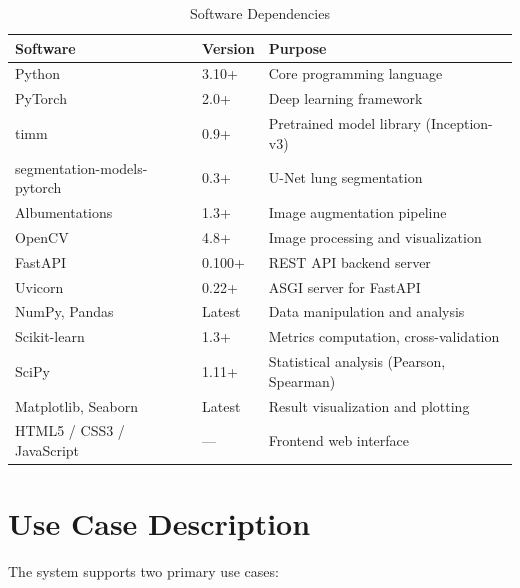 \documentclass[12pt]{report}
\begin{document}
\begin{table}[H]
\centering
\caption{Software Dependencies}
\renewcommand{\arraystretch}{1.2}
\begin{tabular}{|l|l|p{5cm}|}
\hline
\textbf{Software} & \textbf{Version} & \textbf{Purpose} \\
\hline
Python & 3.10+ & Core programming language \\
PyTorch & 2.0+ & Deep learning framework \\
timm & 0.9+ & Pretrained model library (Inception-v3) \\
segmentation-models-pytorch & 0.3+ & U-Net lung segmentation \\
Albumentations & 1.3+ & Image augmentation pipeline \\
OpenCV & 4.8+ & Image processing and visualization \\
FastAPI & 0.100+ & REST API backend server \\
Uvicorn & 0.22+ & ASGI server for FastAPI \\
NumPy, Pandas & Latest & Data manipulation and analysis \\
Scikit-learn & 1.3+ & Metrics computation, cross-validation \\
SciPy & 1.11+ & Statistical analysis (Pearson, Spearman) \\
Matplotlib, Seaborn & Latest & Result visualization and plotting \\
HTML5 / CSS3 / JavaScript & --- & Frontend web interface \\
\hline
\end{tabular}
\end{table}

\section{Use Case Description}

The system supports two primary use cases:
\end{document}
